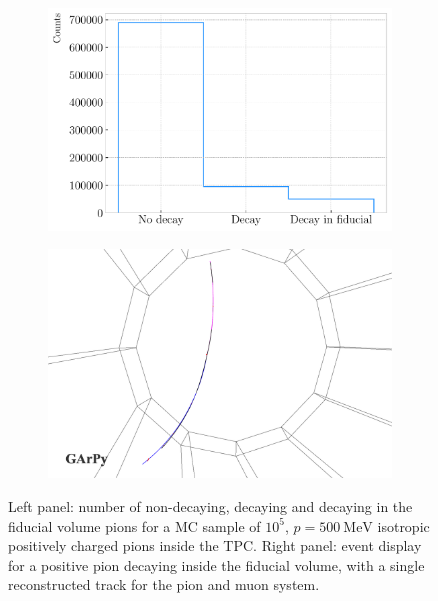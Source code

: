 \begin{figure}[t]
	\begin{subfigure}{0.5\textwidth}
		\centering
		\includegraphics[width=.99\linewidth]{Images/GArSoft_PID/pion_decay/pion_decay_status.pdf}
	\end{subfigure}
	\begin{subfigure}{0.5\textwidth}
		\centering
		\includegraphics[width=.99\linewidth]{Images/GArSoft_PID/pion_decay/pion_decay_evd.png}
	\end{subfigure}
	\caption{Left panel: number of non-decaying, decaying and decaying in the fiducial volume pions for a MC sample of $10^{5}$, $p=500 \ \mathrm{MeV}$ isotropic positively charged pions inside the TPC. Right panel: event display for a positive pion decaying inside the fiducial volume, with a single reconstructed track for the pion and muon system.}
	\label{fig:pion_decays}
\end{figure}


